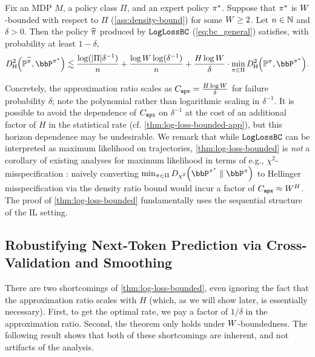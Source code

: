 \begin{theorem}\label{thm:log-loss-bounded}
Fix an MDP $M$, a policy class $\Pi$, and an expert policy $\pi^{\star}$. Suppose that $\pi^{\star}$ is $W$-bounded with respect to $\Pi$ (\cref{ass:density-bound}) for some $W \geq 2$. Let $n \in \mathbb{N}$ and $\delta > 0$. Then the policy $\widehat{\pi}$ produced by $\texttt{LogLossBC}$ (\cref{eq:bc_general}) satisfies, with probability at least $1-\delta$,
\begin{equation} \Dhels{\BP^{\pihat}}{\bbP^{\pistar}} \lesssim \frac{\log(|\Pi|\delta^{-1})}{n} + \frac{\log{}\denbound\log(\delta^{-1})}{n} + \frac{H\log{}\denbound}{\delta} \cdot \min_{\pi \in \Pi} \Dhels{\BP^\pi}{\bbP^{\pistar}}.
\end{equation}
\end{theorem}
Concretely, the approximation ratio scales as $C_{\texttt{apx}}=\frac{H\log W}{\delta}$ for failure probability $\delta$; note the polynomial rather than logarithmic scaling in $\delta^{-1}$. It is possible to avoid the dependence of $C_{\texttt{apx}}$ on $\delta^{-1}$ at the cost of an additional factor of $H$ in the statistical rate (cf. \cref{thm:log-loss-bounded-app}), but this horizon dependence may be undesirable. We remark that while $\texttt{LogLossBC}$ can be interpreted as maximum likelihood on trajectories, \cref{thm:log-loss-bounded} is \emph{not} a corollary of existing analyses for maximum likelihood in terms of e.g., $\chi^2$-misspecification \citep[Proposition B.1]{foster2024behavior}: naively converting $\min_{\pi\in\Pi} \Dchis{\bbP^{\pistar}}{\bbP^{\pi}}$ to Hellinger misspecification via the density ratio bound would incur a factor of $C_{\texttt{apx}} \approx W^H$. The proof of \cref{thm:log-loss-bounded} fundamentally uses the sequential structure of the IL setting.\loose



  \subsection{Robustifying Next-Token Prediction via Cross-Validation and Smoothing}
  \label{sec:improvements}

There are two shortcomings of \cref{thm:log-loss-bounded}, even ignoring the fact that the approximation ratio scales with $H$ (which, as we will show later, is essentially necessary). First, to get the optimal rate, we pay a factor of $1/\delta$ in the approximation ratio. Second, the theorem only holds under $W$-boundedness. The following result
shows that both of these shortcomings are inherent, and not artifacts of the analysis.\loose

